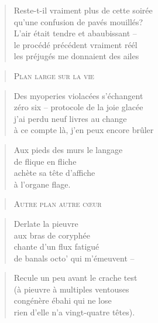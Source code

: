   \begin{verse}
    Reste-t-il vraiment plus de cette soirée\\
    qu’une confusion de pavés mouillés?\\
    L’air était tendre et abaubissant --\\
    le procédé précédent vraiment réél\\
    les préjugés me donnaient des ailes
  \end{verse}
  \begin{verse}
    \textsc{Plan large sur la vie}
  \end{verse}
  \begin{verse}
    Des myoperies violacées s’échangent\\
    zéro six -- protocole de la joie glacée\\
    j’ai perdu neuf livres au change\\
    à ce compte là, j’en peux encore brûler
  \end{verse}
  \begin{verse}
    Aux pieds des murs le langage\\
    de flique en fliche\\
    achète sa tête d’affiche\\
    à l’organe flage.
  \end{verse}
  \begin{verse}
    \textsc{Autre plan autre cœur}
  \end{verse}
  \begin{verse}
    Derlate la pieuvre\\
    aux bras de coryphée\\
    chante d’un flux fatigué\\
    de banals octo’ qui m’émeuvent --
  \end{verse}
  \begin{verse}
    Recule un peu avant le crache test\\
    (à pieuvre à multiples ventouses\\
    congénère ébahi qui ne lose\\
    rien d’elle n’a vingt-quatre têtes).
  \end{verse}

